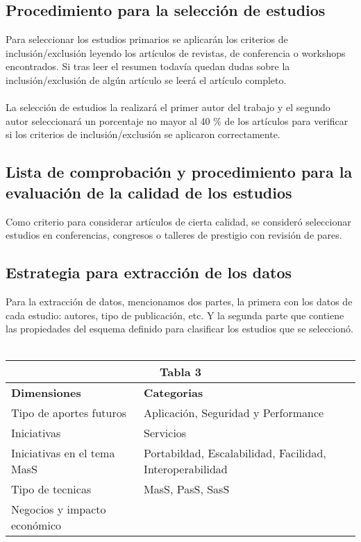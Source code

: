 \documentclass{llncs}
\begin{document}
\subsection{Procedimiento para la selección de estudios}
Para seleccionar los estudios primarios se aplicarán los criterios de inclusión/exclusión leyendo los artículos de revistas, de conferencia o workshops encontrados. Si tras leer el resumen todavía quedan dudas sobre la inclusión/exclusión de algún artículo se leerá el artículo completo.\\ \\
La selección de estudios la realizará el primer autor del trabajo y el segundo autor seleccionará un porcentaje no mayor al 40  \% de los artículos  para verificar si los criterios de inclusión/exclusión se aplicaron correctamente.

\subsection{Lista de comprobación y procedimiento para la evaluación de la calidad de los estudios}
Como criterio para considerar artículos de cierta calidad, se consideró seleccionar estudios en conferencias, congresos o talleres de prestigio con revisión de pares.

\subsection{Estrategia para extracción de los datos}
Para la extracción de datos, mencionamos dos partes, la primera con los datos de cada estudio: autores, tipo de publicación, etc. Y la segunda parte que contiene las propiedades del esquema definido para clasificar los estudios que se seleccionó.\\ \\

\begin{tabular}{  | p{5cm} | p{7cm}  | }
  \hline
  \multicolumn{2}{|c|}{\bf Tabla 3} \\
  \hline
  \bf Dimensiones & \bf Categorias \\
  \hline
   Tipo de aportes futuros &  Aplicación, Seguridad y Performance \\
  \hline
   Iniciativas & Servicios\\
   \hline
   Iniciativas en el tema MasS & Portabildad, Escalabilidad, Facilidad, Interoperabilidad \\
   \hline
    Tipo de tecnicas &  MasS, PasS, SasS\\
   \hline
    Negocios y impacto económico & \\
    \hline
\end{tabular}
\end{document}

